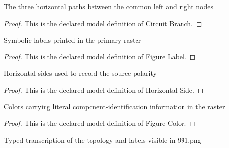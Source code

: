 \begin{definition}
  \label{def:physics:phyx-mini-0991:phyxminiproblems-problemphyxmini0991-circuitbranch}
  The three horizontal paths between the common left and right nodes
\end{definition}
\begin{proof}
  This is the declared model definition of Circuit Branch.
\end{proof}
\begin{definition}
  \label{def:physics:phyx-mini-0991:phyxminiproblems-problemphyxmini0991-figurelabel}
  Symbolic labels printed in the primary raster
\end{definition}
\begin{proof}
  This is the declared model definition of Figure Label.
\end{proof}
\begin{definition}
  \label{def:physics:phyx-mini-0991:phyxminiproblems-problemphyxmini0991-horizontalside}
  Horizontal sides used to record the source polarity
\end{definition}
\begin{proof}
  This is the declared model definition of Horizontal Side.
\end{proof}
\begin{definition}
  \label{def:physics:phyx-mini-0991:phyxminiproblems-problemphyxmini0991-figurecolor}
  Colors carrying literal component-identification information in the raster
\end{definition}
\begin{proof}
  This is the declared model definition of Figure Color.
\end{proof}
\begin{definition}
  \label{def:physics:phyx-mini-0991:phyxminiproblems-problemphyxmini0991-parallelrlrccircuitfigure}
  Typed transcription of the topology and labels visible in 991.png
\end{definition}
